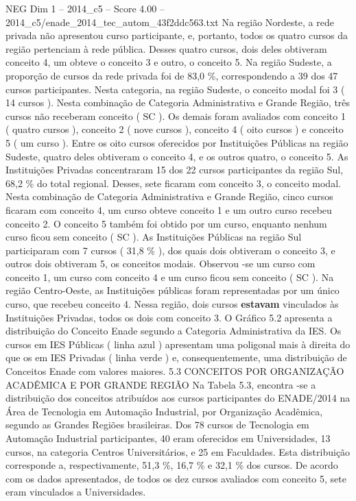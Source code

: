 \begin{textsample}{NEG Dim 1 – 2014\_c5 – Score 4.00 – 2014\_c5/enade\_2014\_tec\_autom\_43f2ddc563.txt}
Na região Nordeste, a rede privada não apresentou curso participante, e, portanto, todos os quatro cursos da região pertenciam à rede pública.
Desses quatro cursos, dois deles obtiveram conceito 4, um obteve o conceito 3 e outro, o conceito 5.
Na região Sudeste, a proporção de cursos da rede privada foi de 83,0 \%, correspondendo a 39 dos 47 cursos participantes.
Nesta categoria, na região Sudeste, o conceito modal foi 3 ( 14 cursos ).
Nesta combinação de Categoria Administrativa e Grande Região, três cursos não receberam conceito ( SC ).
Os demais foram avaliados com conceito 1 ( quatro cursos ), conceito 2 ( nove cursos ), conceito 4 ( oito cursos ) e conceito 5 ( um curso ).
Entre os oito cursos oferecidos por Instituições Públicas na região Sudeste, quatro deles obtiveram o conceito 4, e os outros quatro, o conceito 5.
As Instituições Privadas concentraram 15 dos 22 cursos participantes da região Sul, 68,2 \% do total regional.
Desses, sete ficaram com conceito 3, o conceito modal.
Nesta combinação de Categoria Administrativa e Grande Região, cinco cursos ficaram com conceito 4, um curso obteve conceito 1 e um outro curso recebeu conceito 2.
O conceito 5 também foi obtido por um curso, enquanto nenhum curso ficou sem conceito ( SC ).
As Instituições Públicas na região Sul participaram com 7 cursos ( 31,8 \% ), dos quais dois obtiveram o conceito 3, e outros dois obtiveram 5, os conceitos modais.
Observou -se um curso com conceito 1, um curso com conceito 4 e um curso ficou sem conceito ( SC ).
Na região Centro-Oeste, as Instituições públicas foram representadas por um único curso, que recebeu conceito 4.
Nessa região, dois cursos \textbf{estavam} vinculados às Instituições Privadas, todos os dois com conceito 3.
O Gráfico 5.2 apresenta a distribuição do Conceito Enade segundo a Categoria Administrativa da IES.
Os cursos em IES Públicas ( linha azul ) apresentam uma poligonal mais à direita do que os em IES Privadas ( linha verde ) e, consequentemente, uma distribuição de Conceitos Enade com valores maiores. 5.3 CONCEITOS POR ORGANIZAÇÃO ACADÊMICA E POR GRANDE REGIÃO Na Tabela 5.3, encontra -se a distribuição dos conceitos atribuídos aos cursos participantes do ENADE/2014 na Área de Tecnologia em Automação Industrial, por Organização Acadêmica, segundo as Grandes Regiões brasileiras.
Dos 78 cursos de Tecnologia em Automação Industrial participantes, 40 eram oferecidos em Universidades, 13 cursos, na categoria Centros Universitários, e 25 em Faculdades.
Esta distribuição corresponde a, respectivamente, 51,3 \%, 16,7 \% e 32,1 \% dos cursos.
De acordo com os dados apresentados, de todos os dez cursos avaliados com conceito 5, sete eram vinculados a Universidades.

\end{textsample}
